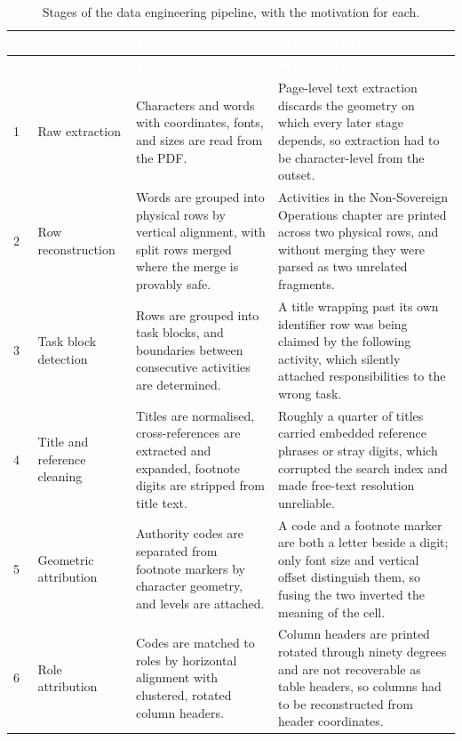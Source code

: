 \begin{longtable}{|p{}|p{}|p{}|p{}|}
\caption{Stages of the data engineering pipeline, with the motivation for each.}\label{tab:stages}\\
\hline
\rowcolor{myblue}\textcolor{white}{\textbf{\#}} & \textcolor{white}{\textbf{Name}} & \textcolor{white}{\textbf{Function}} & \textcolor{white}{\textbf{Why it exists}} \\
\hline
\endfirsthead
\hline
\rowcolor{myblue}\textcolor{white}{\textbf{\#}} & \textcolor{white}{\textbf{Name}} & \textcolor{white}{\textbf{Function}} & \textcolor{white}{\textbf{Why it exists}} \\
\hline
\endhead
1 & Raw extraction & Characters and words with coordinates, fonts, and sizes are read from the PDF. & Page-level text extraction discards the geometry on which every later stage depends, so extraction had to be character-level from the outset. \\ \hline
2 & Row reconstruction & Words are grouped into physical rows by vertical alignment, with split rows merged where the merge is provably safe. & Activities in the Non-Sovereign Operations chapter are printed across two physical rows, and without merging they were parsed as two unrelated fragments. \\ \hline
3 & Task block detection & Rows are grouped into task blocks, and boundaries between consecutive activities are determined. & A title wrapping past its own identifier row was being claimed by the following activity, which silently attached responsibilities to the wrong task. \\ \hline
4 & Title and reference cleaning & Titles are normalised, cross-references are extracted and expanded, footnote digits are stripped from title text. & Roughly a quarter of titles carried embedded reference phrases or stray digits, which corrupted the search index and made free-text resolution unreliable. \\ \hline
5 & Geometric attribution & Authority codes are separated from footnote markers by character geometry, and levels are attached. & A code and a footnote marker are both a letter beside a digit; only font size and vertical offset distinguish them, so fusing the two inverted the meaning of the cell. \\ \hline
6 & Role attribution & Codes are matched to roles by horizontal alignment with clustered, rotated column headers. & Column headers are printed rotated through ninety degrees and are not recoverable as table headers, so columns had to be reconstructed from header coordinates. \\ \hline

\end{longtable}
